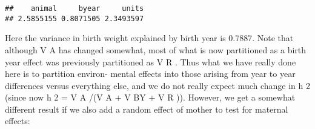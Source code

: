 \documentclass[12pt,]{book}
\newenvironment{Shaded}{\begin{snugshade}}{\end{snugshade}}
\newcommand{\DataTypeTok}[1]{\textcolor[rgb]{0.13,0.29,0.53}{#1}}
\newcommand{\DecValTok}[1]{\textcolor[rgb]{0.00,0.00,0.81}{#1}}
\newcommand{\FloatTok}[1]{\textcolor[rgb]{0.00,0.00,0.81}{#1}}
\newcommand{\KeywordTok}[1]{\textcolor[rgb]{0.13,0.29,0.53}{\textbf{#1}}}
\newcommand{\NormalTok}[1]{#1}
\newcommand{\OperatorTok}[1]{\textcolor[rgb]{0.81,0.36,0.00}{\textbf{#1}}}
\newcommand{\OtherTok}[1]{\textcolor[rgb]{0.56,0.35,0.01}{#1}}
\newcommand{\StringTok}[1]{\textcolor[rgb]{0.31,0.60,0.02}{#1}}
\begin{document}
\begin{Shaded}
\end{Shaded}

\begin{verbatim}
##    animal     byear     units 
## 2.5855155 0.8071505 2.3493597
\end{verbatim}

Here the variance in birth weight explained by birth year is 0.7887. Note that although V A has changed somewhat, most of what is now partitioned as a birth year effect was previously partitioned as V R . Thus what we have really done here is to partition environ- mental effects into those arising from year to year differences versus everything else, and we do not really expect much change in h 2 (since now h 2 = V A /(V A + V BY + V R )). However, we get a somewhat different result if we also add a random effect of mother to test for maternal effects:
\end{document}

